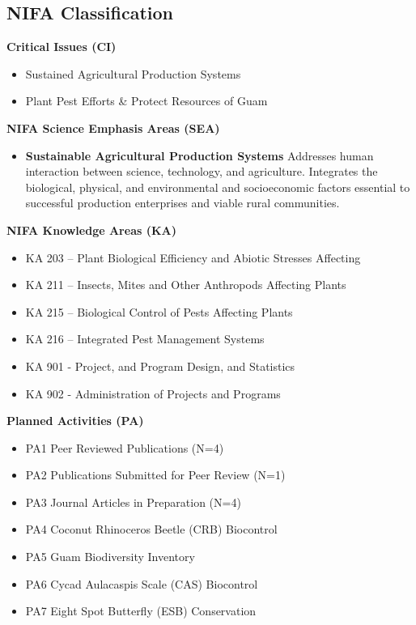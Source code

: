 \subsection{NIFA Classification}

\textbf{Critical Issues (CI)}
\begin{itemize}
	\item Sustained Agricultural Production Systems
	\item Plant Pest Efforts \& Protect Resources of Guam
\end{itemize}

\textbf{NIFA Science Emphasis Areas (SEA)}
\begin{itemize}
	\item \textbf{Sustainable Agricultural Production Systems} Addresses human interaction between science, technology, and agriculture. Integrates the biological, physical, and environmental and socioeconomic factors essential to successful production enterprises and viable rural communities. 
\end{itemize}

\textbf{NIFA Knowledge Areas (KA)}
\begin{itemize}
	\item KA 203 – Plant Biological Efficiency and Abiotic Stresses Affecting
	\item KA 211 – Insects, Mites and Other Anthropods Affecting Plants
	\item KA 215 – Biological Control of Pests Affecting Plants
	\item KA 216 – Integrated Pest Management Systems
	\item KA 901 - Project, and Program Design, and Statistics
	\item KA 902 - Administration of Projects and Programs
\end{itemize}

\textbf{Planned Activities (PA)}
\begin{itemize}
	\item PA1 Peer Reviewed Publications (N=4)
	\item PA2 Publications Submitted for Peer Review (N=1)
	\item PA3 Journal Articles in Preparation (N=4)
	\item PA4 Coconut Rhinoceros Beetle (CRB) Biocontrol
	\item PA5 Guam Biodiversity Inventory
	\item PA6 Cycad Aulacaspis Scale (CAS) Biocontrol
	\item PA7 Eight Spot Butterfly (ESB) Conservation
\end{itemize}


